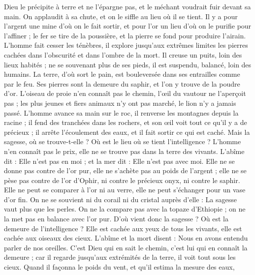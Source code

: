 \begin{multicols}{2}
Dieu le précipite à terre et ne l'épargne pas, et le méchant voudrait fuir devant sa main.
On applaudit à sa chute, et on le siffle au lieu où il se tient.
\VerseOne{}Il y a pour l'argent une mine d'où on le fait sortir, et pour l'or un lieu d'où on le purifie pour l'affiner ;
le fer se tire de la poussière, et la pierre se fond pour produire l'airain.
L'homme fait cesser les ténèbres, il explore jusqu'aux extrêmes limites les pierres cachées dans l'obscurité et dans l'ombre de la mort.
Il creuse un puits, loin des lieux habités ; ne se souvenant plus de ses pieds, il est suspendu, balancé, loin des humains.
La terre, d'où sort le pain, est bouleversée dans ses entrailles comme par le feu.
Ses pierres sont la demeure du saphir, et l'on y trouve de la poudre d'or.
L'oiseau de proie n'en connaît pas le chemin, l'œil du vautour ne l'aperçoit pas ;
les plus jeunes et fiers animaux n'y ont pas marché, le lion n'y a jamais passé.
L'homme avance sa main sur le roc, il renverse les montagnes depuis la racine ;
il fend des tranchées dans les rochers, et son œil voit tout ce qu'il y a de précieux ;
il arrête l'écoulement des eaux, et il fait sortir ce qui est caché.
Mais la sagesse, où se trouve-t-elle ? Où est le lieu où se tient l'intelligence ?
L'homme n'en connaît pas le prix, elle ne se trouve pas dans la terre des vivants.
L'abîme dit : Elle n'est pas en moi ; et la mer dit : Elle n'est pas avec moi.
Elle ne se donne pas contre de l'or pur, elle ne s'achète pas au poids de l'argent ;
elle ne se pèse pas contre de l'or d'Ophir, ni contre le précieux onyx, ni contre le saphir.
Elle ne peut se comparer à l'or ni au verre, elle ne peut s'échanger pour un vase d'or fin.
On ne se souvient ni du corail ni du cristal auprès d'elle : La sagesse vaut plus que les perles.
On ne la compare pas avec la topaze d'Ethiopie ; on ne la met pas en balance avec l'or pur.
D'où vient donc la sagesse ? Où est la demeure de l'intelligence ?
Elle est cachée aux yeux de tous les vivants, elle est cachée aux oiseaux des cieux.
L'abîme et la mort disent : Nous en avons entendu parler de nos oreilles.
C'est Dieu qui en sait le chemin, c'est lui qui en connaît la demeure ;
car il regarde jusqu'aux extrémités de la terre, il voit tout sous les cieux.
Quand il façonna le poids du vent, et qu'il estima la mesure des eaux,

\end{multicols}
